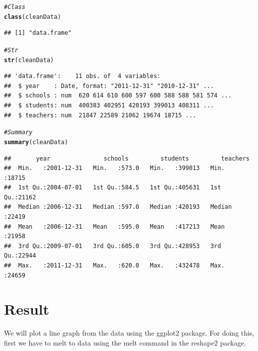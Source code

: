 \documentclass{article}\usepackage[]{graphicx}\usepackage[]{color}
\makeatletter
\newcommand{\hlcom}[1]{\textcolor[rgb]{0.678,0.584,0.686}{\textit{#1}}}%
\newcommand{\hlstd}[1]{\textcolor[rgb]{0.345,0.345,0.345}{#1}}%
\newcommand{\hlkwd}[1]{\textcolor[rgb]{0.737,0.353,0.396}{\textbf{#1}}}%
\newenvironment{kframe}{%
 \def\at@end@of@kframe{}%
 \ifinner\ifhmode%
  \def\at@end@of@kframe{\end{minipage}}%
  \begin{minipage}{\columnwidth}%
 \fi\fi%
 \def\FrameCommand##1{\hskip\@totalleftmargin \hskip-\fboxsep
 \colorbox{shadecolor}{##1}\hskip-\fboxsep
     \hskip-\linewidth \hskip-\@totalleftmargin \hskip\columnwidth}%
 \MakeFramed {\advance\hsize-\width
   \@totalleftmargin\z@ \linewidth\hsize
   \@setminipage}}%
 {\par\unskip\endMakeFramed%
 \at@end@of@kframe}
\newenvironment{knitrout}{}{} %
\makeatother
\begin{document}
\begin{enumerate}
\begin{knitrout}
\color{fgcolor}\begin{kframe}
\begin{alltt}
\hlcom{# Class}
\hlkwd{class}\hlstd{(cleanData)}
\end{alltt}
\begin{verbatim}
## [1] "data.frame"
\end{verbatim}
\begin{alltt}
\hlcom{# Str}
\hlkwd{str}\hlstd{(cleanData)}
\end{alltt}
\begin{verbatim}
## 'data.frame':	11 obs. of  4 variables:
##  $ year    : Date, format: "2011-12-31" "2010-12-31" ...
##  $ schools : num  620 614 610 600 597 600 588 588 581 574 ...
##  $ students: num  400383 402951 420193 399013 408311 ...
##  $ teachers: num  21847 22589 21062 19674 18715 ...
\end{verbatim}
\begin{alltt}
\hlcom{# Summary}
\hlkwd{summary}\hlstd{(cleanData)}
\end{alltt}
\begin{verbatim}
##       year               schools         students         teachers    
##  Min.   :2001-12-31   Min.   :573.0   Min.   :399013   Min.   :18715  
##  1st Qu.:2004-07-01   1st Qu.:584.5   1st Qu.:405631   1st Qu.:21162  
##  Median :2006-12-31   Median :597.0   Median :420193   Median :22419  
##  Mean   :2006-12-31   Mean   :595.0   Mean   :417213   Mean   :21958  
##  3rd Qu.:2009-07-01   3rd Qu.:605.0   3rd Qu.:428953   3rd Qu.:22944  
##  Max.   :2011-12-31   Max.   :620.0   Max.   :432478   Max.   :24659
\end{verbatim}
\end{kframe}
\end{knitrout}



\end {enumerate}

\section {Result}

We will plot a line graph from the data using the ggplot2 package. For doing this, first we have to melt to data using the melt command in the reshape2 package.
\end{document}
